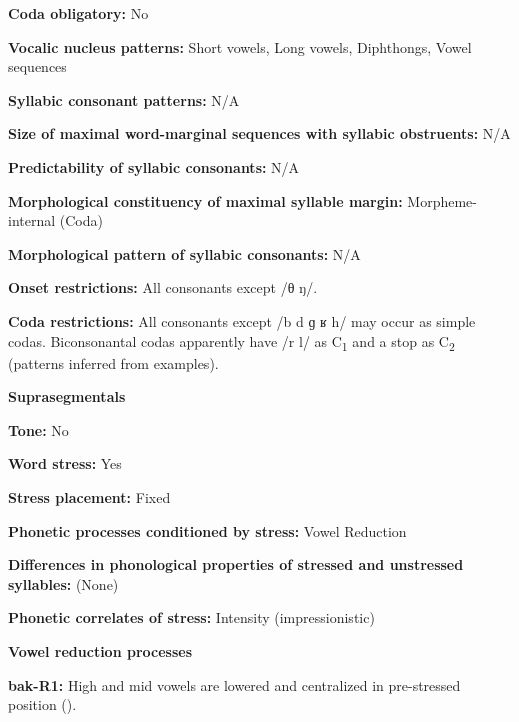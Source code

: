 \textbf{Coda obligatory:} No



\textbf{Vocalic nucleus patterns:} Short vowels, Long vowels, Diphthongs, Vowel sequences



\textbf{Syllabic consonant patterns:} N/A



\textbf{Size of maximal word{}-marginal sequences with syllabic obstruents:} N/A



\textbf{Predictability of syllabic consonants:} N/A



\textbf{Morphological constituency of maximal syllable margin:} Morpheme-internal (Coda)



\textbf{Morphological pattern of syllabic consonants:} N/A



\textbf{Onset restrictions:} All consonants except /θ ŋ/.



\textbf{Coda restrictions:} All consonants except /b d ɡ ʁ h/ may occur as simple codas. Biconsonantal codas apparently have /r l/ as C\textsubscript{1} and a stop as C\textsubscript{2} (patterns inferred from examples).



\textbf{Suprasegmentals}



\textbf{Tone:} No



\textbf{Word stress:} Yes



\textbf{Stress placement:} Fixed



\textbf{Phonetic processes conditioned by stress:} Vowel Reduction



\textbf{Differences in phonological properties of stressed and unstressed syllables:} (None)



\textbf{Phonetic correlates of stress:} Intensity (impressionistic)



\textbf{Vowel reduction processes}



\textbf{bak-R1:} High and mid vowels are lowered and centralized in pre-stressed position (\citealt{CarterRobbins2015}).




